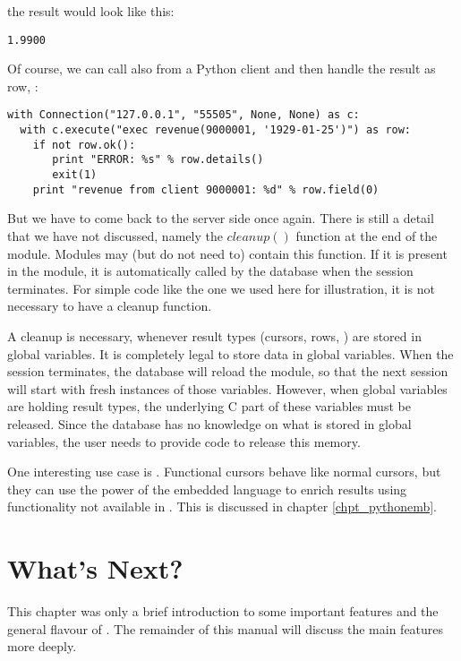 
the result would look like this:
\begin{verbatim}
1.9900
\end{verbatim}

\begin{minipage}{\textwidth}
Of course, we can call 
also from a Python client and then handle
the result as row, \eg:

\begin{python}
\begin{lstlisting}
with Connection("127.0.0.1", "55505", None, None) as c:
  with c.execute("exec revenue(9000001, '1929-01-25')") as row:
    if not row.ok():
       print "ERROR: %s" % row.details()
       exit(1)
    print "revenue from client 9000001: %d" % row.field(0)
\end{lstlisting}
\end{python}
\end{minipage}

But we have to come back to the server side once again.
There is still a detail that we have not discussed,
namely the $cleanup()$ function at the end of the module.
Modules may (but do not need to) contain this
function. If it is present in the module, it is automatically
called by the database when the session terminates.
For simple code like the one we used
here for illustration, it is not necessary to have a cleanup
function. 

A cleanup is necessary, whenever result types
(cursors, rows, \etc) are stored in global variables.
It is completely legal to store data in global variables.
When the session terminates, the database will reload
the module, so that the next session will start with
fresh instances of those variables. However, when
global variables are holding result types, the underlying
C part of these variables must be released.
Since the database has no knowledge on what is stored
in global variables, the user needs to provide code
to release this memory.

One interesting use case is .
Functional cursors behave like normal cursors,
but they can use the power of the embedded language
to enrich results
using functionality
not available in \sql.
This is discussed in chapter \ref{chpt_pythonemb}.

\section{What's Next?}
This chapter was only a brief introduction
to some important features and the general flavour 
of \nowdb. The remainder of this manual will
discuss the main features more deeply.

